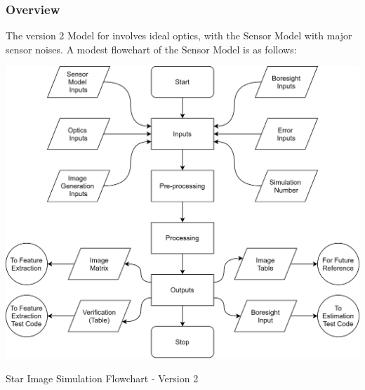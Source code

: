 


\subsubsection{Overview} %
The version 2 Model for \SIS involves ideal optics, with the Sensor Model with major sensor noises. A modest flowchart of the Sensor Model is as follows:

\begin{Flowchart}[h!]
    \centering
    \includegraphics[scale=0.09]{Figures/Model/Sensor Model v2.png}
    \caption{Star Image Simulation Flowchart - Version 2}
    \label{fig:SIS_v2}
\end{Flowchart}


